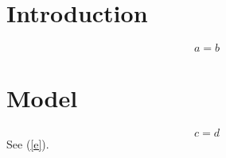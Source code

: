\documentclass{jfmcopy}
\begin{document}
\section{Introduction}
\begin{equation}a=b\end{equation}
\section{Model}
\begin{equation}c=d\label{e}\end{equation}
See (\ref{e}).
\end{document}
